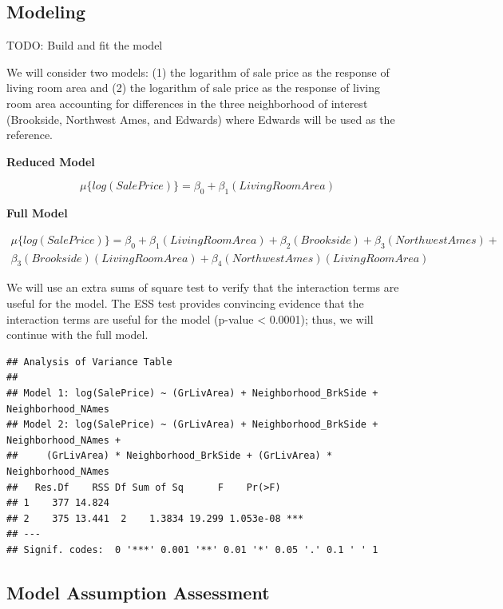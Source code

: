 \documentclass[american,]{article}
\begin{document}
\hypertarget{modeling}{%
\subsection{Modeling}\label{modeling}}

TODO: Build and fit the model

We will consider two models: (1) the logarithm of sale price as the
response of living room area and (2) the logarithm of sale price as the
response of living room area accounting for differences in the three
neighborhood of interest (Brookside, Northwest Ames, and Edwards) where
Edwards will be used as the reference.

\textbf{Reduced Model}

\begin{equation}
\mu \lbrace log(SalePrice) \rbrace = \beta_0 + \beta_1(LivingRoomArea) \label{eq:reduced}
\end{equation}

\textbf{Full Model}

\begin{align}
\mu \lbrace log(SalePrice) \rbrace = \beta_0 + \beta_1(LivingRoomArea) +  \beta_2(Brookside) +\beta_3(NorthwestAmes) + \nonumber\\
\beta_3(Brookside)(LivingRoomArea) + \beta_4(NorthwestAmes)(LivingRoomArea) \label{eq:full}
\end{align}

We will use an extra sums of square test to verify that the interaction
terms are useful for the model. The ESS test provides convincing
evidence that the interaction terms are useful for the model (p-value
\textless{} 0.0001); thus, we will continue with the full model.

\begin{verbatim}
## Analysis of Variance Table
## 
## Model 1: log(SalePrice) ~ (GrLivArea) + Neighborhood_BrkSide + Neighborhood_NAmes
## Model 2: log(SalePrice) ~ (GrLivArea) + Neighborhood_BrkSide + Neighborhood_NAmes + 
##     (GrLivArea) * Neighborhood_BrkSide + (GrLivArea) * Neighborhood_NAmes
##   Res.Df    RSS Df Sum of Sq      F    Pr(>F)    
## 1    377 14.824                                  
## 2    375 13.441  2    1.3834 19.299 1.053e-08 ***
## ---
## Signif. codes:  0 '***' 0.001 '**' 0.01 '*' 0.05 '.' 0.1 ' ' 1
\end{verbatim}

\hypertarget{model-assumption-assessment}{%
\subsection{Model Assumption
Assessment}\label{model-assumption-assessment}}
\end{document}
